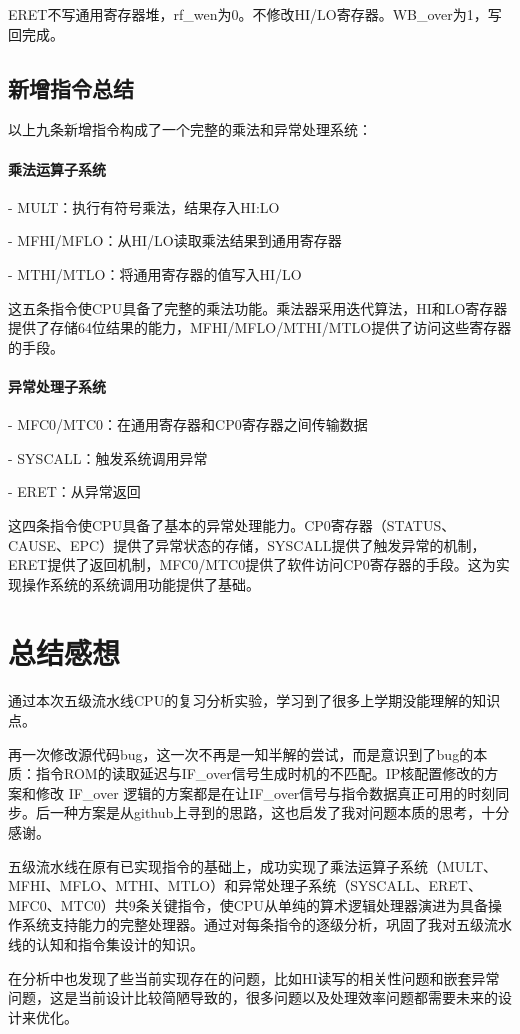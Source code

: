 \documentclass[a4paper]{article}
\begin{document}
	ERET不写通用寄存器堆，rf\_wen为0。不修改HI/LO寄存器。WB\_over为1，写回完成。
	
	\subsection{新增指令总结}
	以上九条新增指令构成了一个完整的乘法和异常处理系统：
	\paragraph{乘法运算子系统}
	
	- MULT：执行有符号乘法，结果存入HI:LO
	
	- MFHI/MFLO：从HI/LO读取乘法结果到通用寄存器
	
	- MTHI/MTLO：将通用寄存器的值写入HI/LO
	
	这五条指令使CPU具备了完整的乘法功能。乘法器采用迭代算法，HI和LO寄存器提供了存储64位结果的能力，MFHI/MFLO/MTHI/MTLO提供了访问这些寄存器的手段。
	
	\paragraph{异常处理子系统}
	
	- MFC0/MTC0：在通用寄存器和CP0寄存器之间传输数据
	
	- SYSCALL：触发系统调用异常
	
	- ERET：从异常返回
	
	这四条指令使CPU具备了基本的异常处理能力。CP0寄存器（STATUS、CAUSE、EPC）提供了异常状态的存储，SYSCALL提供了触发异常的机制，ERET提供了返回机制，MFC0/MTC0提供了软件访问CP0寄存器的手段。这为实现操作系统的系统调用功能提供了基础。
	
	
	\section{总结感想}
	通过本次五级流水线CPU的复习分析实验，学习到了很多上学期没能理解的知识点。
	
	再一次修改源代码bug，这一次不再是一知半解的尝试，而是意识到了bug的本质：指令ROM的读取延迟与IF\_over信号生成时机的不匹配。IP核配置修改的方案和修改 IF\_over 逻辑的方案都是在让IF\_over信号与指令数据真正可用的时刻同步。后一种方案是从github上寻到的思路，这也启发了我对问题本质的思考，十分感谢。
	
	五级流水线在原有已实现指令的基础上，成功实现了乘法运算子系统（MULT、MFHI、MFLO、MTHI、MTLO）和异常处理子系统（SYSCALL、ERET、MFC0、MTC0）共9条关键指令，使CPU从单纯的算术逻辑处理器演进为具备操作系统支持能力的完整处理器。通过对每条指令的逐级分析，巩固了我对五级流水线的认知和指令集设计的知识。
	
	在分析中也发现了些当前实现存在的问题，比如HI读写的相关性问题和嵌套异常问题，这是当前设计比较简陋导致的，很多问题以及处理效率问题都需要未来的设计来优化。
	
\end{document}
